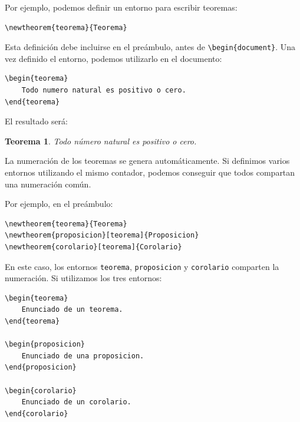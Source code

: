 \documentclass[11pt,a4paper]{article}
\theoremstyle{plain}
\newtheorem{teorema}{Teorema}
\newtheorem{proposicion}[teorema]{Proposición}
\newtheorem{corolario}[teorema]{Corolario}
\theoremstyle{definition}
\theoremstyle{remark}
\theoremstyle{exercise}
\begin{document}
\noindent Por ejemplo, podemos definir un entorno para escribir teoremas:

\begin{lstlisting}
\newtheorem{teorema}{Teorema}
\end{lstlisting}

\noindent Esta definición debe incluirse en el preámbulo, antes de \verb|\begin{document}|. Una vez definido el entorno, podemos utilizarlo en el documento:

\begin{lstlisting}
\begin{teorema}
    Todo numero natural es positivo o cero.
\end{teorema}
\end{lstlisting}

\noindent El resultado será:

\begin{paginarecuadrada}
\begin{teorema}
    Todo número natural es positivo o cero.
\end{teorema}
\end{paginarecuadrada}

\medskip

\noindent La numeración de los teoremas se genera automáticamente. Si definimos varios entornos utilizando el mismo contador, podemos conseguir que todos compartan una numeración común.

\medskip

\noindent Por ejemplo, en el preámbulo:

\begin{lstlisting}
\newtheorem{teorema}{Teorema}
\newtheorem{proposicion}[teorema]{Proposicion}
\newtheorem{corolario}[teorema]{Corolario}
\end{lstlisting}

\noindent En este caso, los entornos \verb|teorema|, \verb|proposicion| y \verb|corolario| comparten la numeración. Si utilizamos los tres entornos:

\begin{lstlisting}
\begin{teorema}
    Enunciado de un teorema.
\end{teorema}

\begin{proposicion}
    Enunciado de una proposicion.
\end{proposicion}

\begin{corolario}
    Enunciado de un corolario.
\end{corolario}
\end{lstlisting}
\end{document}

